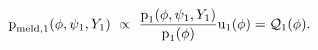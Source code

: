 \begin{equation}
  \text{p}_{\text{meld}, 1}(\phi, \psi_{1}, Y_{1}) \,\,\propto\,\,
  \frac {
    \text{p}_{1}(\phi, \psi_1, Y_{1})
  } {
    \text{p}_{1}(\phi)
  }
  \text{u}_{1}(\phi)
  =
  \mathcal{Q}_{1}(\phi).
  \label{eqn:stage-one-target}
\end{equation}